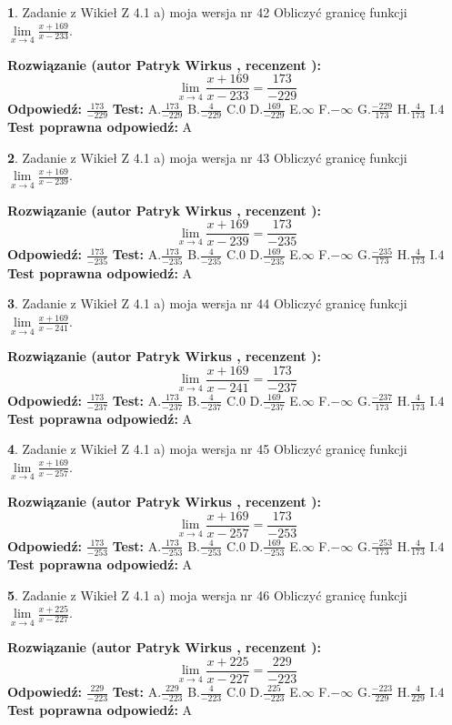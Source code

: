 \documentclass[12pt, a4paper]{article}
\theoremstyle{definition} %
\newtheorem{zad}{}
\newcommand{\zadStart}[1]{\begin{zad}#1\newline}
\newcommand{\zadStop}{\end{zad}}
\newcommand{\rozwStart}[2]{\noindent \textbf{Rozwiązanie (autor #1 , recenzent #2): }\newline}
\newcommand{\rozwStop}{\newline}
\newcommand{\odpStart}{\noindent \textbf{Odpowiedź:}\newline}
\newcommand{\odpStop}{\newline}
\newcommand{\testStart}{\noindent \textbf{Test:}\newline}
\newcommand{\testStop}{\newline}
\newcommand{\kluczStart}{\noindent \textbf{Test poprawna odpowiedź:}\newline}
\newcommand{\kluczStop}{\newline}
\begin{document}
\zadStart{Zadanie z Wikieł Z 4.1 a) moja wersja nr 42}
Obliczyć granicę funkcji $\lim\limits_{x\to4}\frac{x+169}{x-233}$.
\zadStop
\rozwStart{Patryk Wirkus}{}
$$\lim\limits_{x\to4}\frac{x+169}{x-233} = \frac{173}{-229}$$
\rozwStop
\odpStart
$\frac{173}{-229}$
\odpStop
\testStart
A.$\frac{173}{-229}$
B.$\frac{4}{-229}$
C.$0$
D.$\frac{169}{-229}$
E.$\infty$
F.$-\infty$
G.$\frac{-229}{173}$
H.$\frac{4}{173}$
I.$4$
\testStop
\kluczStart
A
\kluczStop



\zadStart{Zadanie z Wikieł Z 4.1 a) moja wersja nr 43}
Obliczyć granicę funkcji $\lim\limits_{x\to4}\frac{x+169}{x-239}$.
\zadStop
\rozwStart{Patryk Wirkus}{}
$$\lim\limits_{x\to4}\frac{x+169}{x-239} = \frac{173}{-235}$$
\rozwStop
\odpStart
$\frac{173}{-235}$
\odpStop
\testStart
A.$\frac{173}{-235}$
B.$\frac{4}{-235}$
C.$0$
D.$\frac{169}{-235}$
E.$\infty$
F.$-\infty$
G.$\frac{-235}{173}$
H.$\frac{4}{173}$
I.$4$
\testStop
\kluczStart
A
\kluczStop



\zadStart{Zadanie z Wikieł Z 4.1 a) moja wersja nr 44}
Obliczyć granicę funkcji $\lim\limits_{x\to4}\frac{x+169}{x-241}$.
\zadStop
\rozwStart{Patryk Wirkus}{}
$$\lim\limits_{x\to4}\frac{x+169}{x-241} = \frac{173}{-237}$$
\rozwStop
\odpStart
$\frac{173}{-237}$
\odpStop
\testStart
A.$\frac{173}{-237}$
B.$\frac{4}{-237}$
C.$0$
D.$\frac{169}{-237}$
E.$\infty$
F.$-\infty$
G.$\frac{-237}{173}$
H.$\frac{4}{173}$
I.$4$
\testStop
\kluczStart
A
\kluczStop



\zadStart{Zadanie z Wikieł Z 4.1 a) moja wersja nr 45}
Obliczyć granicę funkcji $\lim\limits_{x\to4}\frac{x+169}{x-257}$.
\zadStop
\rozwStart{Patryk Wirkus}{}
$$\lim\limits_{x\to4}\frac{x+169}{x-257} = \frac{173}{-253}$$
\rozwStop
\odpStart
$\frac{173}{-253}$
\odpStop
\testStart
A.$\frac{173}{-253}$
B.$\frac{4}{-253}$
C.$0$
D.$\frac{169}{-253}$
E.$\infty$
F.$-\infty$
G.$\frac{-253}{173}$
H.$\frac{4}{173}$
I.$4$
\testStop
\kluczStart
A
\kluczStop



\zadStart{Zadanie z Wikieł Z 4.1 a) moja wersja nr 46}
Obliczyć granicę funkcji $\lim\limits_{x\to4}\frac{x+225}{x-227}$.
\zadStop
\rozwStart{Patryk Wirkus}{}
$$\lim\limits_{x\to4}\frac{x+225}{x-227} = \frac{229}{-223}$$
\rozwStop
\odpStart
$\frac{229}{-223}$
\odpStop
\testStart
A.$\frac{229}{-223}$
B.$\frac{4}{-223}$
C.$0$
D.$\frac{225}{-223}$
E.$\infty$
F.$-\infty$
G.$\frac{-223}{229}$
H.$\frac{4}{229}$
I.$4$
\testStop
\kluczStart
A
\kluczStop
\end{document}

